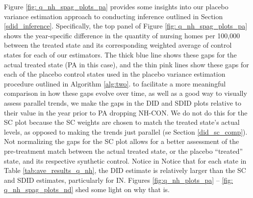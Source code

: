 \documentclass[../Main.tex]{subfiles}
\begin{document}
\indent Figure \ref{fig: q_nh_spag_plots_pa} provides some insights into our placebo variance estimation approach to conducting inference outlined in Section \ref{sdid_inference}. Specifically, the top panel of Figure \ref{fig: q_nh_spag_plots_pa} shows the year-specific difference in the quantity of nursing homes per 100,000 between the treated state and its corresponding weighted average of control states for each of our estimators. The thick blue line shows these gaps for the actual treated state (PA in this case), and the thin pink lines show these gaps for each of the placebo control states used in the placebo variance estimation procedure outlined in Algorithm \ref{alg:two}. to facilitate a more meaningful comparison in how these gaps evolve over time, as well as a good way to visually assess parallel trends, we make the gaps in the DID and SDID plots relative to their value in the year prior to PA dropping NH-CON. We do not do this for the SC plot because the SC weights are chosen to match the treated state's actual levels, as opposed to making the trends just parallel (se Section \ref{did_sc_comp}). Not normalizing the gaps for the SC plot allows for a better assessment of the pre-treatment match between the actual treated state, or the placebo ``treated'' state, and its respective synthetic control. Notice in  
\indent Notice that for each state in Table \ref{tab:ave_results_q_nh}, the DID estimate is relatively larger than the SC and SDID estimates, particularly for IN. Figures \ref{fig:q_nh_plots_pa} -- \ref{fig: q_nh_spag_plots_nd} shed some light on why that is.
\end{document}

